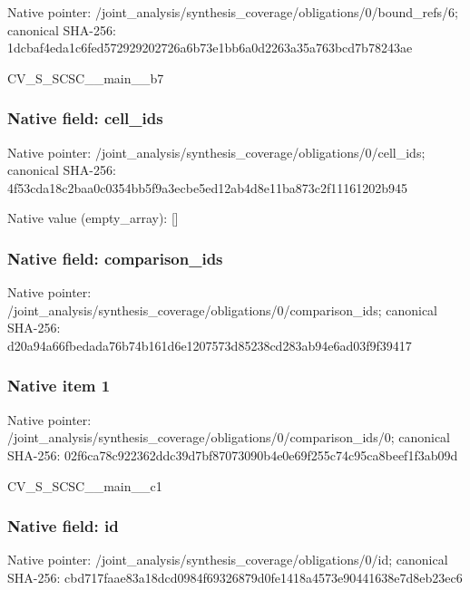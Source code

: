 \documentclass[10pt,a4paper]{article}
\begin{document}
Native pointer: /joint\_analysis/synthesi\allowbreak{}s\_coverage/obligations/0\allowbreak{}/bound\_refs/6; canonical SHA-256: 1dcbaf4eda1c6fed57292920\allowbreak{}2726a6b73e1bb6a0d2263a35\allowbreak{}a763bcd7b78243ae


CV\_S\_SCSC\_\_main\_\_b7


\subsubsection{Native field: cell\_ids}


Native pointer: /joint\_analysis/synthesi\allowbreak{}s\_coverage/obligations/0\allowbreak{}/cell\_ids; canonical SHA-256: 4f53cda18c2baa0c0354bb5f\allowbreak{}9a3ecbe5ed12ab4d8e11ba87\allowbreak{}3c2f11161202b945



Native value (empty\_array): []



\subsubsection{Native field: comparison\_ids}


Native pointer: /joint\_analysis/synthesi\allowbreak{}s\_coverage/obligations/0\allowbreak{}/comparison\_ids; canonical SHA-256: d20a94a66fbedada76b74b16\allowbreak{}1d6e1207573d85238cd283ab\allowbreak{}94e6ad03f9f39417



\subsubsection{Native item 1}


Native pointer: /joint\_analysis/synthesi\allowbreak{}s\_coverage/obligations/0\allowbreak{}/comparison\_ids/0; canonical SHA-256: 02f6ca78c922362ddc39d7bf\allowbreak{}87073090b4e0e69f255c74c9\allowbreak{}5ca8beef1f3ab09d


CV\_S\_SCSC\_\_main\_\_c1


\subsubsection{Native field: id}


Native pointer: /joint\_analysis/synthesi\allowbreak{}s\_coverage/obligations/0\allowbreak{}/id; canonical SHA-256: cbd717faae83a18dcd0984f6\allowbreak{}9326879d0fe1418a4573e904\allowbreak{}41638e7d8eb23ec6
\end{document}
